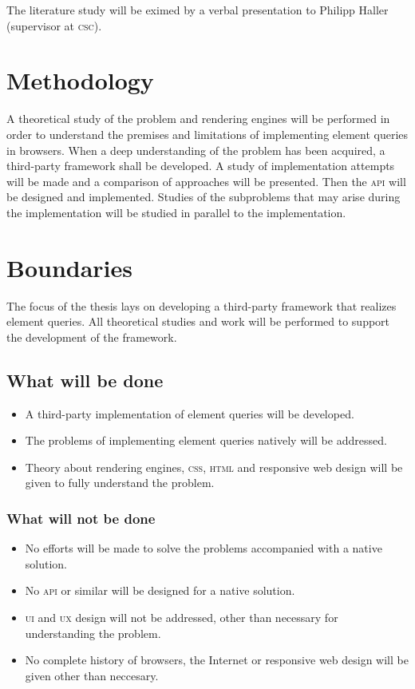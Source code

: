 \documentclass[oneside,a4paper,11pt]{kth-mag}
\begin{document}
The literature study will be eximed by a verbal presentation to Philipp Haller (supervisor at \textsc{csc}).

\section*{Methodology}
A theoretical study of the problem and rendering engines will be performed in order to understand the premises and limitations of implementing element queries in browsers. When a deep understanding of the problem has been acquired, a third-party framework shall be developed. A study of implementation attempts will be made and a comparison of approaches will be presented. Then the \textsc{api} will be designed and implemented. Studies of the subproblems that may arise during the implementation will be studied in parallel to the implementation.

\section*{Boundaries}
The focus of the thesis lays on developing a third-party framework that realizes element queries. All theoretical studies and work will be performed to support the development of the framework.

\subsection*{What will be done}
\begin{itemize}
\item A third-party implementation of element queries will be developed.
\item The problems of implementing element queries natively will be addressed.
\item Theory about rendering engines, \textsc{css}, \textsc{html} and responsive web design will be given to fully understand the problem.
\end{itemize}

\subsubsection*{What will not be done}
\begin{itemize}
\item No efforts will be made to solve the problems accompanied with a native solution.
\item No \textsc{api} or similar will be designed for a native solution.
\item \textsc{ui} and \textsc{ux} design will not be addressed, other than necessary for understanding the problem.
\item No complete history of browsers, the Internet or responsive web design will be given other than neccesary.
\end{itemize}
\end{document}
